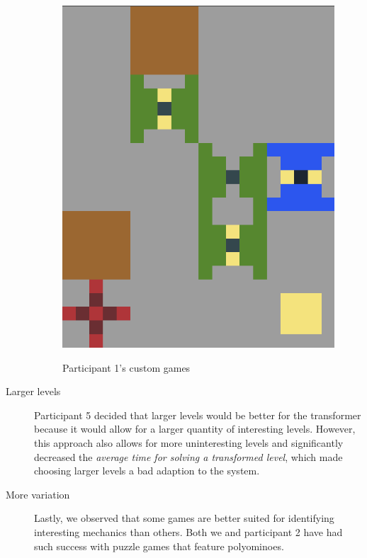 \begin{description}
\begin{figure}
\begin{minipage}[t]{0.3\textwidth}
\includegraphics[width=\textwidth]{figures/part1allgreentoblueonyellow.png} \\
\end{minipage}
\caption{Participant 1's custom games \label{fig:part1smalllevelgames}}
\end{figure}

    \item[Larger levels] Participant 5 decided that larger levels would be better for the transformer because it would allow for a larger quantity of interesting levels. However, this approach also allows for more uninteresting levels and significantly decreased the \textit{average time for solving a transformed level}, which made choosing larger levels a bad adaption to the system.
    
    \item[More variation] Lastly, we observed that some games are better suited for identifying interesting mechanics than others. Both we and participant 2 have had such success with puzzle games that feature polyominoes.


\end{description}

